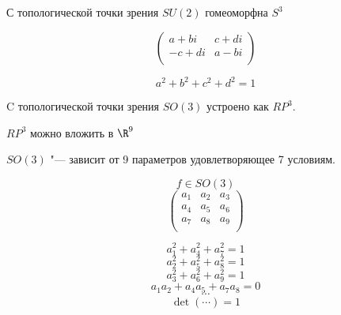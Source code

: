 \begin{Rem}
С топологической точки зрения 
$SU(2)$  гомеоморфна $S^3$

$$ 
\begin{pmatrix}
a + bi & c + di\\
-c + di & a - bi\\
\end{pmatrix}
$$

$$a^2 + b^2 + c^2 + d^2 = 1$$

C топологической точки зрения $SO(3)$  устроено как $RP^3$.

$RP^3$  можно вложить в $\R^9$

$SO(3)$ "--- зависит от 9 параметров удовлетворяющее 7 условиям. 

$$f \in SO(3)$$
$$
\begin{pmatrix}
a_1 & a_2 & a_3\\
a_4 & a_5 & a_6\\
a_7 & a_8 & a_9\\
\end{pmatrix}
$$

$$a_1^2 + a_4^2 + a_7^2 = 1$$
$$a_2^2 + a_5^2 + a_8^2 = 1$$
$$a_3^2 + a_6^2 + a_9^2 = 1$$
$$a_1a_2 + a_4a_5 + a_7a_8 = 0$$
$$\cdots$$
$$\det(\cdots) = 1$$
\end{Rem}
